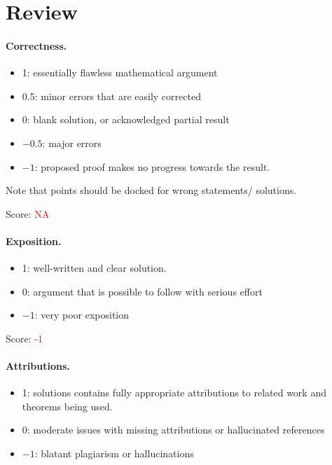 \documentclass[11pt]{article}
\theoremstyle{definition}
\begin{document}
\maketitle

\section{Review}

\paragraph{Correctness.}
\begin{itemize}
	\item  1: essentially flawless mathematical argument
	\item  0.5: minor errors that are easily corrected
	\item  0: blank solution, or acknowledged partial result
	\item  $-0.5$: major errors
	\item  $-1$: proposed proof makes no progress towards the result.
\end{itemize}
Note that points should be docked for wrong statements/ solutions.

\noindent Score:
 \textcolor{red}{NA}
\paragraph{Exposition.}
\begin{itemize}
	\item  1: well-written and clear solution.
	\item  0: argument that is possible to follow with serious effort
	\item  $-1$: very poor exposition
\end{itemize}

\noindent Score: \textcolor{red}{-1}

\paragraph{Attributions.}
\begin{itemize}
	\item  1: solutions contains fully appropriate attributions
		to related work and theorems being used.
	\item  0: moderate issues with missing attributions or hallucinated references
	\item  $-1$: blatant plagiarism or hallucinations
\end{itemize}
\end{document}

